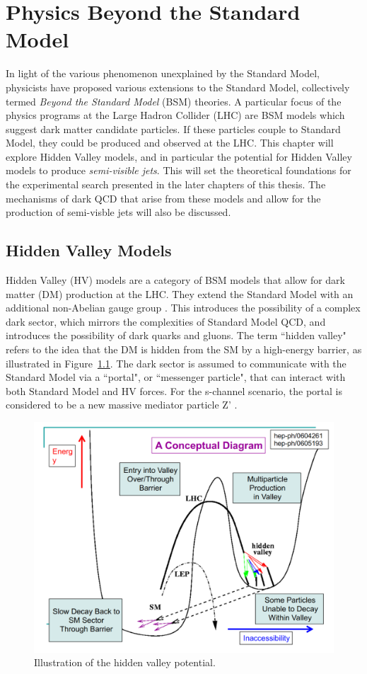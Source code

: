 \chapter{Physics Beyond the Standard Model}
\label{ch:theory}
In light of the various phenomenon unexplained by the Standard Model, physicists have proposed various extensions to the Standard Model, collectively termed \textit{Beyond the Standard Model} (BSM) theories. 
A particular focus of the physics programs at the Large Hadron Collider (LHC) are BSM models which suggest dark matter candidate particles. If these particles couple to Standard Model, they could be produced and observed at the LHC.
This chapter will explore Hidden Valley models, and in particular the potential for Hidden Valley models to produce \textit{semi-visible jets}. This will set the theoretical foundations for the experimental search presented in the later chapters of this thesis. The mechanisms of dark QCD that arise from these models and allow for the production of semi-visble jets will also be discussed.

\section{Hidden Valley Models}
\label{sec:hiddenvalley}

Hidden Valley (HV) models are a category of BSM models that allow for dark matter (DM) production at the LHC. They extend the Standard Model with an additional non-Abelian gauge group \cite{snowmass}. This introduces the possibility of a complex dark sector, which mirrors the complexities of Standard Model QCD, and introduces the possibility of dark quarks and gluons. The term ``hidden valley" refers to the idea that the DM is hidden from the SM by a high-energy barrier, as illustrated in Figure~\ref{fig:hidden_valley_sketch}. The dark sector is assumed to communicate with the Standard Model via a ``portal", or ``messenger particle", that can interact with both Standard Model and HV forces. For the s-channel scenario, the portal is considered to be a new massive mediator particle Z' . \par

\begin{figure}[h]
        \centering
	\includegraphics[width=.5\textwidth]{figures/ch2/hidden_valley_sketch.png}
         \caption{Illustration of the hidden valley potential.
         \label{fig:hidden_valley_sketch}}
\end{figure}

